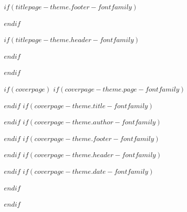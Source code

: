 $if(titlepage-theme.footer-fontfamily)$
\usepackage{fontspec}
$endif$

$if(titlepage-theme.header-fontfamily)$
\usepackage{fontspec}
$endif$

$endif$

$if(coverpage)$
$if(coverpage-theme.page-fontfamily)$
\usepackage{fontspec}
$endif$
$if(coverpage-theme.title-fontfamily)$
\usepackage{fontspec}
$endif$
$if(coverpage-theme.author-fontfamily)$
\usepackage{fontspec}
$endif$
$if(coverpage-theme.footer-fontfamily)$
\usepackage{fontspec}
$endif$
$if(coverpage-theme.header-fontfamily)$
\usepackage{fontspec}
$endif$
$if(coverpage-theme.date-fontfamily)$
\usepackage{fontspec}
$endif$

$endif$

